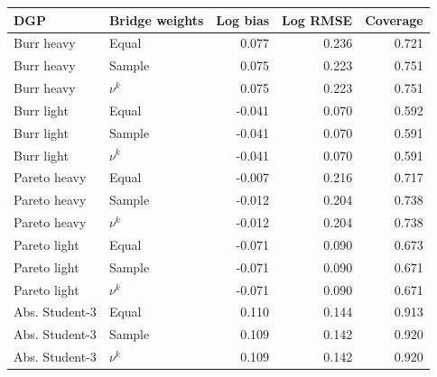 \begin{tabular}{llrrr}
\toprule
DGP & Bridge weights & Log bias & Log RMSE & Coverage \\
\midrule
Burr heavy & Equal & 0.077 & 0.236 & 0.721 \\
Burr heavy & Sample & 0.075 & 0.223 & 0.751 \\
Burr heavy & $\nu^k$ & 0.075 & 0.223 & 0.751 \\
Burr light & Equal & -0.041 & 0.070 & 0.592 \\
Burr light & Sample & -0.041 & 0.070 & 0.591 \\
Burr light & $\nu^k$ & -0.041 & 0.070 & 0.591 \\
Pareto heavy & Equal & -0.007 & 0.216 & 0.717 \\
Pareto heavy & Sample & -0.012 & 0.204 & 0.738 \\
Pareto heavy & $\nu^k$ & -0.012 & 0.204 & 0.738 \\
Pareto light & Equal & -0.071 & 0.090 & 0.673 \\
Pareto light & Sample & -0.071 & 0.090 & 0.671 \\
Pareto light & $\nu^k$ & -0.071 & 0.090 & 0.671 \\
Abs. Student-3 & Equal & 0.110 & 0.144 & 0.913 \\
Abs. Student-3 & Sample & 0.109 & 0.142 & 0.920 \\
Abs. Student-3 & $\nu^k$ & 0.109 & 0.142 & 0.920 \\
\bottomrule
\end{tabular}
